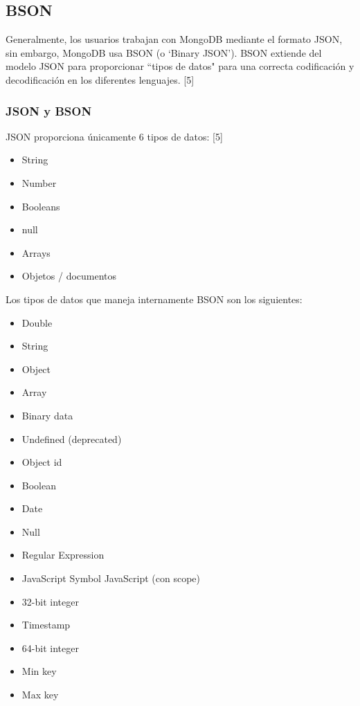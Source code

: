 \documentclass[twocolumn]{article}
\begin{document}
\subsection{BSON}

Generalmente, los usuarios trabajan con MongoDB mediante el formato JSON, sin embargo, MongoDB usa BSON (o `Binary JSON'). BSON extiende del modelo JSON para proporcionar ``tipos de datos" para una correcta codificación y decodificación en los diferentes lenguajes. [5]

\subsubsection{JSON y BSON}

JSON proporciona únicamente 6 tipos de datos: [5]

\begin{itemize}
  \item String
  \item Number
  \item Booleans
  \item null
  \item Arrays
  \item Objetos / documentos
\end{itemize}

Los tipos de datos que maneja internamente BSON son los siguientes:

\begin{itemize}
  \item Double
  \item String
  \item Object
  \item Array
  \item Binary data
  \item Undefined (deprecated)
  \item Object id
  \item Boolean
  \item Date
  \item Null
  \item Regular Expression
  \item JavaScript Symbol JavaScript (con scope)
  \item 32-bit integer
  \item Timestamp
  \item 64-bit integer
  \item Min key
  \item Max key
\end{itemize}
\end{document}

